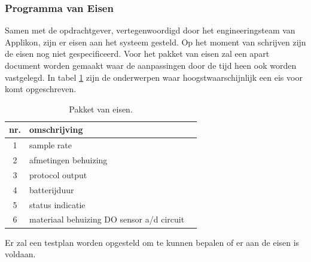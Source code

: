 \subsubsection{Programma van Eisen}
Samen met de opdrachtgever, vertegenwoordigd door het engineeringsteam van Applikon, zijn er eisen aan het systeem gesteld. Op het moment van schrijven zijn de eisen nog niet gespecificeerd. Voor het pakket van eisen zal een apart document worden gemaakt waar de aanpassingen door de tijd heen ook worden vastgelegd. In tabel \ref{tab:PakketvanEisen} zijn de onderwerpen waar hoogstwaarschijnlijk een eis voor komt opgeschreven. 

\begin{table}[H]
	\centering
	\caption{Pakket van eisen.}
	\label{tab:PakketvanEisen}
	\begin{tabular}{clc}
		\toprule
		nr. & omschrijving  &  \\ 
		\midrule
		1 & sample rate &  \\
		2 & afmetingen behuizing &  \\
		3 & protocol output  &  \\
		4 & batterijduur &  \\
		5 & status indicatie &  \\
		6 & materiaal behuizing DO sensor a/d circuit &  \\
		\bottomrule
	\end{tabular}
\end{table}

Er zal een testplan worden opgesteld om te kunnen bepalen of er aan de eisen is voldaan. 